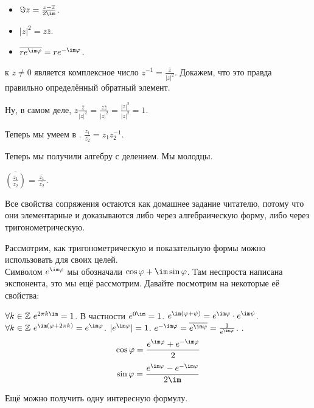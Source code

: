 \documentclass{article}
\begin{document}
\begin{itemize}
\begin{itemize}
            \item $\Im z=\frac{z-\overline z}{2\im}$.
            \item $|z|^2=z\overline z$.
            \item $\overline{re^{\im\varphi}}=re^{-\im\varphi}$.
        \end{itemize}
        \dfn {} к $z\neq0$ является комплексное число $z^{-1}=\frac{\overline z}{|z|^2}$.
        \thm Докажем, что это правда правильно определённый обратный элемент.
        \begin{Proof}
            Ну, в самом деле, $z\frac{\overline z}{|z|^2}=\frac{z\overline z}{|z|^2}=\frac{|z|^2}{|z|^2}=1$.
        \end{Proof}
        \dfn Теперь мы умеем в . $\frac{z_1}{z_2}=z_1z_2^{-1}$.
        \begin{Comment}
            Теперь мы получили алгебру с делением. Мы молодцы.
        \end{Comment}
        \thm $\overline{\left(\frac{z_1}{z_2}\right)}=\frac{\,\overline{z_1}\,}{\,\overline{z_2}\,}$.
        \begin{Proof}
            Все свойства сопряжения остаются как домашнее задание читателю, потому что они элементарные и доказываются либо через алгебраическую форму, либо через тригонометрическую.
        \end{Proof}
        \begin{Comment}
            Рассмотрим, как тригонометрическую и показательную формы можно использовать для своих целей.\\
            Символом $e^{\im\varphi}$ мы обозначали $\cos\varphi+\im\sin\varphi$. Там неспроста написана экспонента, это мы ещё рассмотрим. Давайте посмотрим на некоторые её свойства:
        \end{Comment}
        \thm $\forall k\in\mathbb Z~e^{2\pi k\im}=1$. В частности $e^{0\im}=1$.
        \thm $e^{\im(\varphi+\psi)}=e^{\im\varphi}\cdot e^{\im\psi}$.
        \thm $\forall k\in\mathbb Z~e^{\im(\varphi+2\pi k)}=e^{\im\varphi}$.
        \thm $|e^{\im\varphi}|=1$.
        \thm $e^{-\im\varphi}=\overline{e^{\im\varphi}}=\frac1{e^{\im\varphi}}$.
        \thm {}. $$\cos\varphi=\frac{e^{\im\varphi}+e^{-\im\varphi}}2$$
        $$\sin\varphi=\frac{e^{\im\varphi}-e^{-\im\varphi}}{2\im}$$
        \begin{Comment}
            Ещё можно получить одну интересную формулу.\\

\end{Comment}
\end{itemize}
\end{document}
